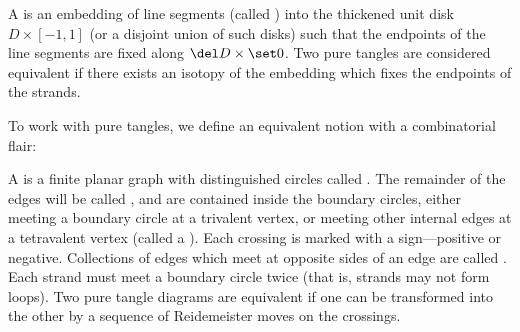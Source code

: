 \documentclass{article}
\begin{document}
\begin{definition}
        A  is an embedding of line segments (called
        ) into the thickened unit disk $D \times [-1,1]$ (or a
        disjoint union of such disks) such that the endpoints of the line
        segments are fixed along $\del D \times \set0$. Two pure tangles are
        considered equivalent if there exists an isotopy of the embedding which
        fixes the endpoints of the strands.
\end{definition}

To work with pure tangles, we define an equivalent notion with a combinatorial
flair:

\begin{definition}\label{def:pure_tangle_diagram}
        A  is a finite planar graph with distinguished
        circles called . The remainder of the edges will
        be called , and are contained inside the boundary circles,
        either meeting a boundary circle at a trivalent vertex, or meeting other
        internal edges at a tetravalent vertex (called a ). Each
        crossing is marked with a sign---positive or negative. Collections of
        edges which meet at opposite sides of an edge are called .
        Each strand must meet a boundary circle twice (that is, strands may not
        form loops). Two pure tangle diagrams are equivalent if one can be
        transformed into the other by a sequence of Reidemeister moves on the
        crossings.
\end{definition}
\end{document}
